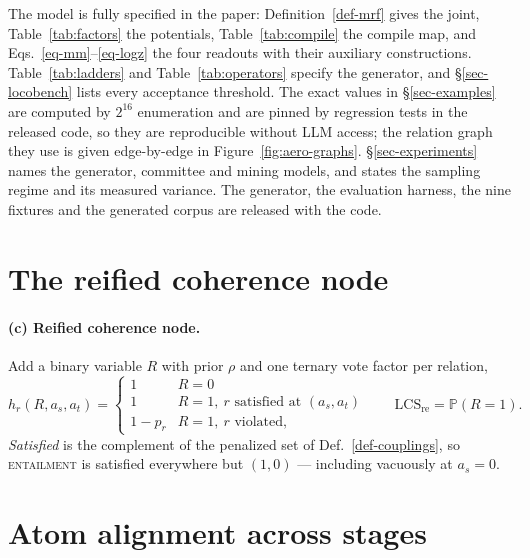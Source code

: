\documentclass{article} %
\newcommand{\pr}[1]{\mathbb{P}\!\left( #1 \right)}
\newcommand{\coupling}[1]{\textsc{#1}}          %
\newcommand{\LCS}{\mathrm{LCS}}
\newcommand{\readout}[1]{\ensuremath{\mathrm{#1}}}
\newcommand{\rei}{\readout{re}}
\begin{document}
The model is fully specified in the paper: Definition~\ref{def-mrf} gives the joint,
Table~\ref{tab:factors} the potentials, Table~\ref{tab:compile} the compile map, and
Eqs.~\ref{eq-mm}--\ref{eq-logz} the four readouts with their auxiliary constructions.
Table~\ref{tab:ladders} and Table~\ref{tab:operators} specify the generator, and
\S\ref{sec-locobench} lists every acceptance threshold. The exact values in
\S\ref{sec-examples} are computed by $2^{16}$ enumeration and are pinned by regression tests
in the released code, so they are reproducible without LLM access; the relation graph they use
is given edge-by-edge in Figure~\ref{fig:aero-graphs}. \S\ref{sec-experiments} names the
generator, committee and mining models, and states the sampling regime and its measured
variance. The generator, the evaluation harness, the nine fixtures and the generated corpus
are released with the code.




\appendix
\section{The reified coherence node}
\label{app-reified}

\paragraph{(c) Reified coherence node.} Add a binary variable $R$ with prior $\rho$ and one
ternary vote factor per relation,
\begin{equation}
h_r(R,a_s,a_t)=\begin{cases}
1 & R=0\\
1 & R=1,\ r \text{ satisfied at } (a_s,a_t)\\
1-p_r & R=1,\ r \text{ violated},
\end{cases}
\qquad \LCS_{\rei}=\pr{R=1}.
\label{eq-reified}
\end{equation}
\emph{Satisfied} is the complement of the penalized set of Def.~\ref{def-couplings}, so
\coupling{entailment} is satisfied everywhere but $(1,0)$ --- including vacuously at $a_s=0$.

\section{Atom alignment across stages}
\label{app-align}
\end{document}
